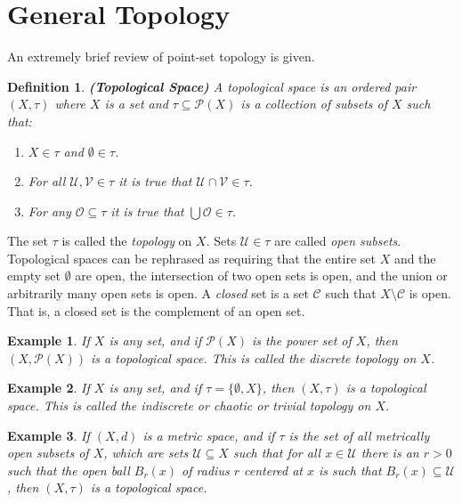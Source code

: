 \documentclass{article}
\theoremstyle{plain}
\theoremstyle{normal}
\newtheorem{definition}{Definition}[section]
\newtheorem{example}{Example}[section]
\begin{document}
    \section{General Topology}
        An extremely brief review of point-set topology is given.
        \begin{definition}{\textbf{(Topological Space)}}
            A topological space is an ordered pair $(X,\tau)$ where $X$ is a
            set and $\tau\subseteq\mathcal{P}(X)$ is a collection of subsets of
            $X$ such that:
            \begin{enumerate}
                \item $X\in\tau$ and $\emptyset\in\tau$.
                \item For all $\mathcal{U},\mathcal{V}\in\tau$ it is true that
                    $\mathcal{U}\cap\mathcal{V}\in\tau$.
                \item For any $\mathcal{O}\subseteq\tau$ it is true that
                    $\bigcup\mathcal{O}\in\tau$.
            \end{enumerate}
        \end{definition}
        The set $\tau$ is called the \textit{topology} on $X$. Sets
        $\mathcal{U}\in\tau$ are called \textit{open subsets}. Topological
        spaces can be rephrased as requiring that the entire set $X$ and the
        empty set $\emptyset$ are open, the intersection of two open sets is
        open, and the union or arbitrarily many open sets is open. A
        \textit{closed} set is a set $\mathcal{C}$ such that
        $X\setminus\mathcal{C}$ is open. That is, a closed set is the complement
        of an open set.
        \begin{example}
            If $X$ is any set, and if $\mathcal{P}(X)$ is the power set of $X$,
            then $(X,\mathcal{P}(X))$ is a topological space. This is called the
            \textit{discrete} topology on $X$.
        \end{example}
        \begin{example}
            If $X$ is any set, and if $\tau=\{\emptyset,X\}$, then
            $(X,\tau)$ is a topological space. This is called the
            \textit{indiscrete} or \textit{chaotic} or \textit{trivial} topology
            on $X$.
        \end{example}
        \begin{example}
            If $(X,d)$ is a metric space, and if $\tau$ is the set of all
            \textit{metrically open} subsets of $X$, which are sets
            $\mathcal{U}\subseteq{X}$ such that for all $x\in\mathcal{U}$ there
            is an $r>0$ such that the open ball $B_{r}(x)$ of radius $r$
            centered at $x$ is such that $B_{r}(x)\subseteq\mathcal{U}$, then
            $(X,\tau)$ is a topological space.
        \end{example}
\end{document}
